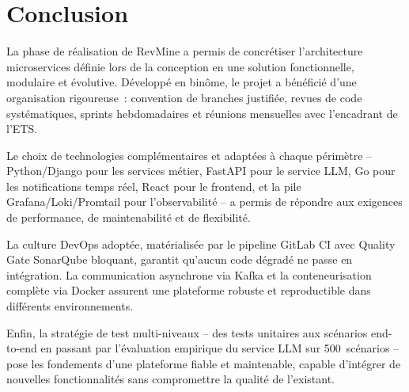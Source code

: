 \section{Conclusion}

La phase de réalisation de RevMine a permis de concrétiser l'architecture microservices définie
lors de la conception en une solution fonctionnelle, modulaire et évolutive. Développé en binôme,
le projet a bénéficié d'une organisation rigoureuse~: convention de branches justifiée, revues de
code systématiques, sprints hebdomadaires et réunions mensuelles avec l'encadrant de l'ETS.

Le choix de technologies complémentaires et adaptées à chaque périmètre -- Python/Django pour les
services métier, FastAPI pour le service LLM, Go pour les notifications temps réel, React pour
le frontend, et la pile Grafana/Loki/Promtail pour l'observabilité -- a permis de répondre aux
exigences de performance, de maintenabilité et de flexibilité.

La culture DevOps adoptée, matérialisée par le pipeline GitLab CI avec Quality Gate SonarQube
bloquant, garantit qu'aucun code dégradé ne passe en intégration. La communication asynchrone
via Kafka et la conteneurisation complète via Docker assurent une plateforme robuste et
reproductible dans différents environnements.

Enfin, la stratégie de test multi-niveaux -- des tests unitaires aux scénarios end-to-end en
passant par l'évaluation empirique du service LLM sur 500~scénarios -- pose les fondements d'une
plateforme fiable et maintenable, capable d'intégrer de nouvelles fonctionnalités sans compromettre
la qualité de l'existant.